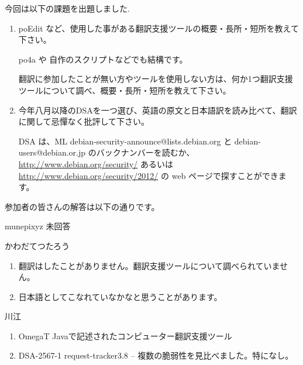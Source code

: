 \documentclass[mingoth,a4paper]{jsarticle}
\begin{document}
今回は以下の課題を出題しました.
\begin{screen}
  \begin{enumerate}
  \item poEdit など、使用した事がある翻訳支援ツールの概要・長所・短所を教えて下さい。

    po4a や 自作のスクリプトなどでも結構です。

    翻訳に参加したことが無い方やツールを使用しない方は、何か1つ翻訳支援ツールについて調べ、概要・長所・短所を教えて下さい。

  \item 今年八月以降のDSAを一つ選び、英語の原文と日本語訳を読み比べて、翻訳に関して忌憚なく批評して下さい。

    DSA は、ML debian-security-announce@lists.debian.org と debian-users@debian.or.jp のバックナンバーを読むか、
    \url{http://www.debian.org/security/} あるいは \url{http://www.debian.org/security/2012/} の web ページで探すことができます。

  \end{enumerate}
\end{screen}

参加者の皆さんの解答は以下の通りです。


\begin{prework}{ munepixyz }
未回答

\end{prework}

\begin{prework}{ かわだてつたろう }
\begin{enumerate}
\item 翻訳はしたことがありません。翻訳支援ツールについて調べられていません。
\item 日本語としてこなれていなかなと思うことがあります。
\end{enumerate}
\end{prework}


\begin{prework}{ 川江 }

\begin{enumerate}
\item OmegaT Javaで記述されたコンピューター翻訳支援ツール
\item DSA-2567-1 request-tracker3.8 -- 複数の脆弱性を見比べました。特になし。
\end{enumerate}

\end{prework}
\end{document}
